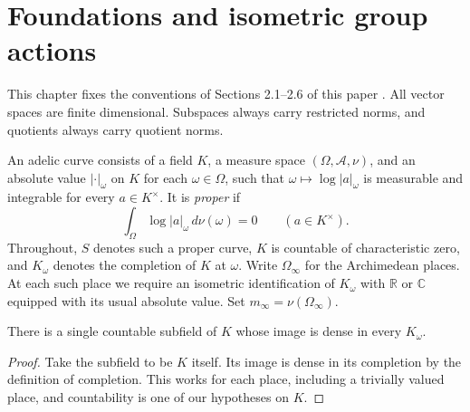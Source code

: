 \chapter{Foundations and isometric group actions}

This chapter fixes the conventions of Sections 2.1--2.6 of this paper
\cite{bost2026}. All vector spaces are finite dimensional. Subspaces always
carry restricted norms, and quotients always carry quotient norms.

\begin{definition}
\label{def:adelic-context}
\leanok
An adelic curve consists of a field $K$, a measure space
$(\Omega,\mathcal A,\nu)$, and an absolute value $|\cdot|_\omega$ on $K$
for each $\omega\in\Omega$, such that
$\omega\mapsto\log|a|_\omega$ is measurable and integrable for every
$a\in K^\times$. It is \emph{proper} if
\[
  \int_\Omega\log|a|_\omega\,d\nu(\omega)=0
  \qquad(a\in K^\times).
\]
Throughout, $S$ denotes such a proper curve, $K$ is countable of characteristic
zero, and $K_\omega$ denotes the completion of $K$ at $\omega$.
Write $\Omega_\infty$ for the Archimedean places. At each such place we
require an isometric identification of $K_\omega$ with $\mathbb R$ or
$\mathbb C$ equipped with its usual absolute value. Set
$m_\infty=\nu(\Omega_\infty)$.
\end{definition}

\begin{lemma}
\label{lem:countable-common-density}
\leanok
There is a single countable subfield of $K$ whose image is dense in every
$K_\omega$.
\end{lemma}
\begin{proof}
Take the subfield to be $K$ itself. Its image is dense in its completion by
the definition of completion. This works for each place, including a
trivially valued place, and countability is one of our hypotheses on $K$.
\end{proof}

